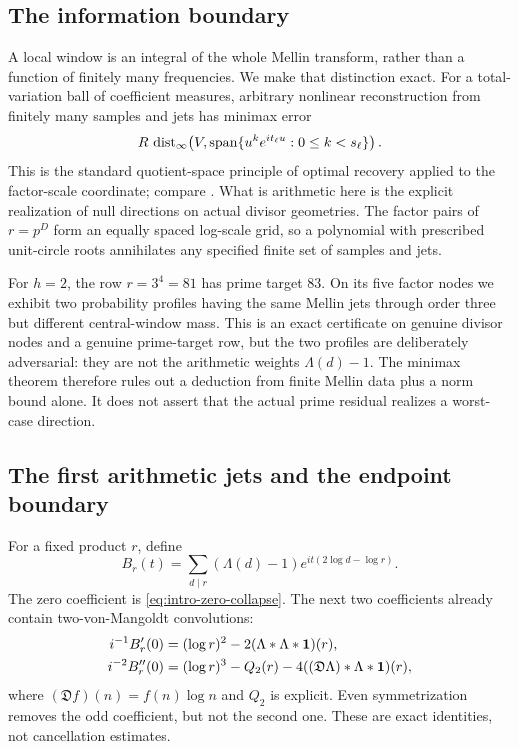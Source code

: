 \subsection{The information boundary}

A local window is an integral of the whole Mellin transform, rather than
a function of finitely many frequencies.  We make that distinction exact.
For a total-variation ball of coefficient measures, arbitrary nonlinear
reconstruction from finitely many samples and jets has minimax error
\begin{equation}\label{eq:intro-minimax-preview}
 R\,\operatorname{dist}_\infty\!\left(
 V,\operatorname{span}\{u^k e^{it_\ell u}:0\leq k<s_\ell\}
 \right).
\end{equation}
This is the standard quotient-space principle of optimal recovery applied
to the factor-scale coordinate; compare \citep{MicchelliRivlin1977}.
What is arithmetic here is the explicit realization of null directions on
actual divisor geometries.  The factor pairs of $r=p^D$ form an equally
spaced log-scale grid, so a polynomial with prescribed unit-circle roots
annihilates any specified finite set of samples and jets.

For $h=2$, the row $r=3^4=81$ has prime target $83$.  On its five factor
nodes we exhibit two probability profiles having the same Mellin jets
through order three but different central-window mass.  This is an exact
certificate on genuine divisor nodes and a genuine prime-target row, but
the two profiles are deliberately adversarial: they are not the arithmetic
weights $\Lambda(d)-1$.  The minimax theorem therefore rules out a
deduction from finite Mellin data plus a norm bound alone.  It does not
assert that the actual prime residual realizes a worst-case direction.

\subsection{The first arithmetic jets and the endpoint boundary}

For a fixed product $r$, define
\[
 B_r(t)=\sum_{d\mid r}(\Lambda(d)-1)
 e^{it(2\log d-\log r)}.
\]
The zero coefficient is \eqref{eq:intro-zero-collapse}.  The next two
coefficients already contain two-von-Mangoldt convolutions:
\begin{align*}
 i^{-1}B_r'(0)
  &=(\log r)^2-2(\Lambda*\Lambda*\mathbf 1)(r),\\
 i^{-2}B_r''(0)
  &=(\log r)^3-Q_2(r)
    -4((\mathfrak D\Lambda)*\Lambda*\mathbf 1)(r),
\end{align*}
where $(\mathfrak Df)(n)=f(n)\log n$ and $Q_2$ is explicit.  Even
symmetrization removes the odd coefficient, but not the second one.
These are exact identities, not cancellation estimates.

